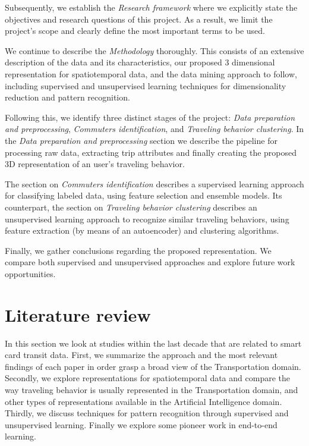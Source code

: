 \documentclass{article}
\begin{document}
Subsequently, we establish the \textit{Research framework} where we explicitly state the objectives and research questions of this project. As a result, we limit the project's scope and clearly define the most important terms to be used. 

We continue to describe the \textit{Methodology} thoroughly. This consists of an extensive description of the data and its characteristics, our proposed 3 dimensional representation for spatiotemporal data, and the data mining approach to follow, including supervised and unsupervised learning techniques for dimensionality reduction and pattern recognition.

Following this, we identify three distinct stages of the project: \textit{Data preparation and preprocessing}, \textit{Commuters identification}, and \textit{Traveling behavior clustering}. In the \textit{Data preparation and preprocessing} section we describe the pipeline for processing raw data, extracting trip attributes and finally creating the proposed 3D representation of an user's traveling behavior. 

The section on \textit{Commuters identification} describes a supervised learning approach for classifying labeled data, using feature selection and ensemble models. Its counterpart, the section on \textit{Traveling behavior clustering} describes an unsupervised  learning approach to recognize similar traveling behaviors, using feature extraction (by means of an autoencoder) and clustering algorithms. 

Finally, we gather conclusions regarding the proposed representation. We compare both supervised and unsupervised approaches and explore future work opportunities. 

\newpage
\section{Literature review}
In this section we look at studies within the last decade that are related to smart card transit data. First, we summarize the approach and the most relevant findings of each paper in order grasp a broad view of the Transportation domain. Secondly, we explore representations for spatiotemporal data and compare the way traveling behavior is usually represented in the Transportation domain, and other types of representations available in the Artificial Intelligence domain. Thirdly, we discuss techniques for pattern recognition through supervised and unsupervised learning. Finally we explore some pioneer work in end-to-end learning. 
\end{document}
